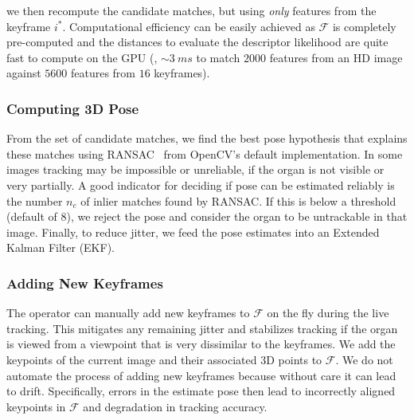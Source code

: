we then recompute the candidate matches, but using \emph{only} features from the keyframe $i^*$.
Computational efficiency can be easily achieved as $\mathcal{F}$ is completely pre-computed and the distances to evaluate the descriptor likelihood are quite fast to compute on the GPU (\eg, $\sim\SI{3}{ms}$ to match $2000$ features from an HD image against $5600$ features from $16$ keyframes).

\subsubsection{Computing 3D Pose}
From the set of candidate matches, we find the best pose hypothesis that explains these  matches using   RANSAC~\cite{Fischler:1981:RSC:358669.358692} from OpenCV's default implementation.
In some images tracking may be impossible or unreliable, if the organ is not visible or very partially. A good indicator for deciding if pose can be estimated reliably is the number $n_c$ of inlier matches found by RANSAC. If this is below a threshold (default of $8$), we reject the pose and consider the organ to be untrackable in that image. Finally, to reduce jitter, we feed the pose estimates into an Extended Kalman Filter (EKF). 

\subsubsection{Adding New Keyframes}
The operator can manually add new keyframes to $\mathcal{F}$ on the fly during the live tracking.
This mitigates any remaining jitter and stabilizes tracking if the organ is viewed from a viewpoint that is very dissimilar to the keyframes.
We add the keypoints of the current image and their associated 3D points to $\mathcal{F}$.
We do not automate the process of adding new keyframes because without care it can lead to drift.
Specifically, errors in the estimate pose then lead to incorrectly aligned keypoints in $\mathcal{F}$ and degradation in tracking accuracy.

